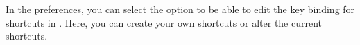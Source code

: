 In the  preferences, you can select the  option to be able to edit the key binding for shortcuts in \app{}. Here, you can create your own shortcuts or alter the current shortcuts. 
